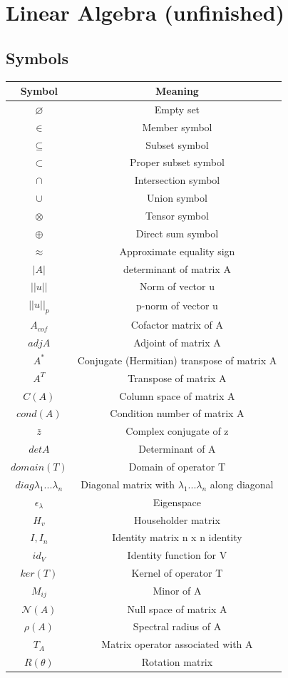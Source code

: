 \documentclass{article}
\newcommand{\Null}{\mathcal{N}}
\begin{document}
\newpage
\section{Linear Algebra (unfinished)}
\subsection{Symbols}
\begin{tabular}{|c|c|}
\hline
\textbf{Symbol} & \textbf{Meaning}  \\
\hline
$\varnothing$ & Empty set \\
\hline
$\in$ & Member symbol \\
\hline
$\subseteq$ & Subset symbol \\
\hline
$\subset$ & Proper subset symbol \\
\hline
$\cap$ & Intersection symbol \\
\hline
$\cup$ & Union symbol \\
\hline
$\otimes$ & Tensor symbol \\
\hline
$\oplus$ & Direct sum symbol \\
\hline
$\approx$ & Approximate equality sign \\
\hline
$|A|$ & determinant of matrix A \\
\hline
$||u||$ & Norm of vector u \\
\hline
$||u||_p$ & p-norm of vector u \\
\hline
$A_{cof}$ & Cofactor matrix of A \\
\hline
$adjA$ & Adjoint of matrix A \\
\hline
$A^*$ & Conjugate (Hermitian) transpose of matrix A \\
\hline
$A^T$ & Transpose of matrix A \\
\hline
$C(A)$ & Column space of matrix A \\
\hline
$cond(A)$ & Condition number of matrix A \\
\hline
$\bar{z}$ & Complex conjugate of z \\
\hline
$det A$ & Determinant of A \\
\hline
$domain(T)$ & Domain of operator T \\
\hline
$diag\lambda_1...\lambda_n$ & Diagonal matrix with $\lambda_1...\lambda_n$ along diagonal\\
\hline
$\epsilon_\lambda$ & Eigenspace \\
\hline
$H_v$ & Householder matrix \\
\hline
$I,I_n$ & Identity matrix n x n identity \\
\hline
$id_V$ & Identity function for V \\
\hline
$ker(T)$ & Kernel of operator T \\
\hline
$M_{ij}$ & Minor of A \\
\hline
$\Null(A)$ & Null space of matrix A \\
\hline
$\rho(A)$ & Spectral radius of A \\
\hline
$T_A$ & Matrix operator associated with A \\
\hline
$R(\theta)$ & Rotation matrix \\
\hline


\end{tabular}
\end{document}
